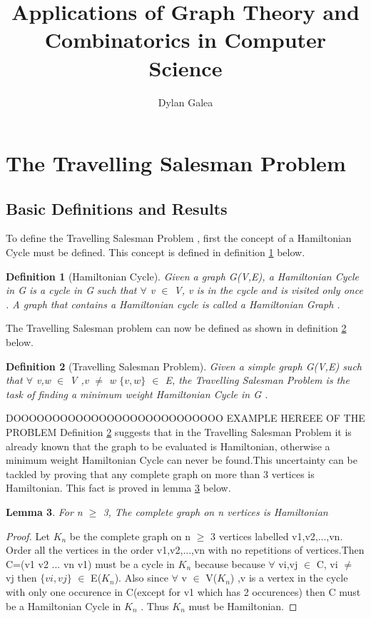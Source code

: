 \documentclass{article}
\title{Applications of Graph Theory and Combinatorics in Computer Science}
\author{Dylan Galea}
\newtheorem{definition}{Definition}[subsection]
\newtheorem{lemma}[definition]{Lemma}
\begin{document}
\maketitle
\newpage
\tableofcontents
\newpage
\section{The Travelling Salesman Problem}
\subsection{Basic Definitions and Results}
To define the Travelling Salesman Problem , first the concept of a Hamiltonian Cycle must be defined. This concept is defined in definition \ref{Hamiltonian Cycle} below.
\begin{definition}[Hamiltonian Cycle]
\label{Hamiltonian Cycle}
Given a graph G(V,E), a Hamiltonian Cycle in G is a cycle in G such that $\forall$ v $\in$ V, v is in the cycle and is visited only once . A graph that contains a Hamiltonian cycle is called a Hamiltonian Graph \cite{weisstein_2018}.
\end{definition}
The Travelling Salesman problem can now be defined as shown in definition \ref{Travelling Salesman Problem} below.
\begin{definition}[Travelling Salesman Problem]
\label{Travelling Salesman Problem}
Given a simple graph G(V,E) such that $\forall$ v,w $\in$ V ,v $\ne$ w $\{v,w\}$ $\in$ E, the Travelling Salesman Problem is the task of finding a minimum weight Hamiltonian Cycle in G \cite{geeksforgeeks_2018}.
\end{definition}
DOOOOOOOOOOOOOOOOOOOOOOOOOOO EXAMPLE HEREEE OF THE PROBLEM 
Definition \ref{Travelling Salesman Problem} suggests that in the Travelling Salesman Problem it is already known that the graph to be evaluated is Hamiltonian, otherwise a minimum weight Hamiltonian Cycle can never be found.This uncertainty can be tackled by proving
that any complete graph on more than 3 vertices is Hamiltonian. This fact is proved in lemma \ref{Kn is Hamiltonian} below.
\begin{lemma}
\label{Kn is Hamiltonian}
For n $\geq$ 3, The complete graph on n vertices is Hamiltonian
\end{lemma}
\begin{proof}
Let $K_n$ be the complete graph on n $\geq$ 3 vertices labelled v1,v2,...,vn. Order all the vertices in the order v1,v2,...,vn with no repetitions of vertices.Then C=(v1 v2 ... vn v1) must be a cycle in $K_n$ because because $\forall$ vi,vj $\in$ C, vi $\ne$ vj then $\{vi,vj\}$ $\in$ E($K_n$). Also since $\forall$ v $\in$ V($K_n$) ,v is a vertex in the cycle with only one occurence in C(except for v1 which has 2 occurences) then C must be a Hamiltonian Cycle in $K_n$ . Thus $K_n$ must be Hamiltonian.
\end{proof}
\end{document}
